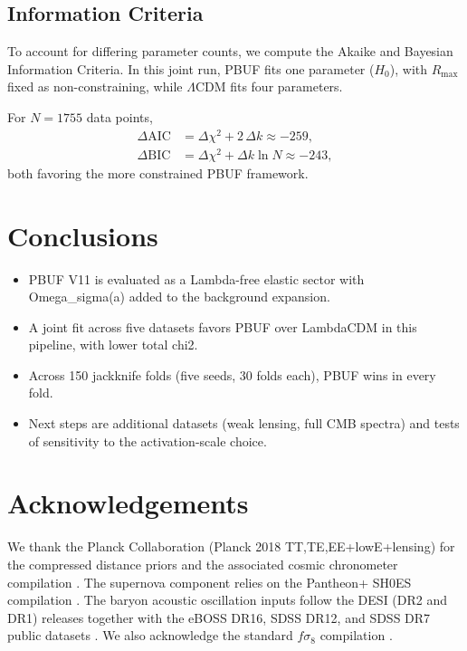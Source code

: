 \documentclass[11pt]{article}
\begin{document}
\subsection*{Information Criteria}

To account for differing parameter counts, we compute the Akaike and Bayesian Information Criteria.
In this joint run, PBUF fits one parameter (\(H_0\)), with \(R_{\max}\) fixed as non-constraining, while \(\Lambda\)CDM fits four parameters.

For \(N=1755\) data points,
\begin{align}
\Delta \mathrm{AIC} &= \Delta \chi^2 + 2\,\Delta k \approx -259,\\
\Delta \mathrm{BIC} &= \Delta \chi^2 + \Delta k \ln N \approx -243,
\end{align}
both favoring the more constrained PBUF framework.

\section{Conclusions}
\begin{itemize}
\item PBUF V11 is evaluated as a Lambda-free elastic sector with Omega\_sigma(a) added to the background expansion.
\item A joint fit across five datasets favors PBUF over LambdaCDM in this pipeline, with lower total chi2.
\item Across 150 jackknife folds (five seeds, 30 folds each), PBUF wins in every fold.
\item Next steps are additional datasets (weak lensing, full CMB spectra) and tests of sensitivity to the activation-scale choice.
\end{itemize}

\section*{Acknowledgements}
We thank the Planck Collaboration (Planck 2018 TT,TE,EE+lowE+lensing) for the compressed distance priors and the associated cosmic chronometer compilation \cite{planck2018}. The supernova component relies on the Pantheon+ SH0ES compilation \cite{pantheonplus}. The baryon acoustic oscillation inputs follow the DESI (DR2 and DR1) releases together with the eBOSS DR16, SDSS DR12, and SDSS DR7 public datasets \cite{bao_desi_dr2,bao_desi_dr1,bao_eboss_dr16,bao_sdss_dr12,bao_sdss_dr7}. We also acknowledge the standard $f\sigma_8$ compilation \cite{fsigma8_compilation}.
\end{document}
